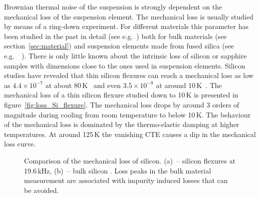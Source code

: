 Brownian thermal noise of the suspension is strongly dependent on the mechanical loss of the suspension element. The mechanical loss is usually studied by means of a ring-down experiment. For different materials this parameter has been studied in the past in detail (see e.g.~\cite{McGuigan1978,Rowan2000,Rowan2003,Nawrodt2008,Reid2006,Nawrodt_2010_arXiv}) both for bulk materials (see section~\ref{sec:material}) and suspension elements made from fused silica (see e.g.\ ~\cite{Rowan1997,Heptonstall2006,Gretarrson1999,Penn2001,Penn2006}). There is only little known about the intrinsic loss of silicon or sapphire samples with dimensions close to the ones used in suspension elements. Silicon studies have revealed that thin silicon flexures can reach a mechanical loss as low as $4.4\times10^{-7}$ at about 80\,K~\cite{Reid2006} and even $3.5\times10^{-8}$ at around 10\,K~\cite{Nawrodt_2010_arXiv}. The mechanical loss of a thin silicon flexure studied down to 10\,K is presented in figure~\ref{fig:loss_Si_flexure}. The mechanical loss drops by around 3 orders of magnitude during cooling from room temperature to below 10\,K. The behaviour of the mechanical loss is dominated by the thermo-elastic damping at higher temperatures. At around 125\,K the vanishing CTE causes a dip in the mechanical loss curve.

\begin{figure}[!h]
\begin{center}
\end{center}
\caption{Comparison of the mechanical loss of silicon. (a)~-- silicon flexures \cite{Nawrodt_2010_arXiv} at 19.6\,kHz, (b)~-- bulk silicon \cite{McGuigan1978}. Loss peaks in the bulk material measurement are associated with impurity induced losses that can be avoided.}
\end{figure}

